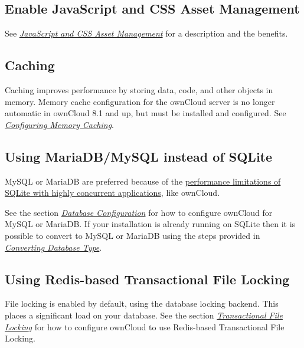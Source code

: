 \documentclass[letterpaper,10pt,english]{sphinxmanual}
\begin{document}
\subsection{Enable JavaScript and CSS Asset Management}
\label{configuration_server/oc_server_tuning:enable-javascript-and-css-asset-management}
See {\hyperref[configuration_server/js_css_asset_management_configuration::doc]{\emph{JavaScript and CSS Asset Management}}} for a description and the
benefits.


\subsection{Caching}
\label{configuration_server/oc_server_tuning:caching}\label{configuration_server/oc_server_tuning:id1}
Caching improves performance by storing data, code, and other objects in memory.
Memory cache configuration for the ownCloud server is no longer automatic in
ownCloud 8.1 and up, but must be installed and configured. See
{\hyperref[configuration_server/caching_configuration::doc]{\emph{Configuring Memory Caching}}}.


\subsection{Using MariaDB/MySQL instead of SQLite}
\label{configuration_server/oc_server_tuning:using-mariadb-mysql-instead-of-sqlite}
MySQL or MariaDB are preferred because of the \href{http://www.sqlite.org/whentouse.html}{performance limitations of
SQLite with highly concurrent applications}, like ownCloud.

See the section {\hyperref[configuration_database/linux_database_configuration::doc]{\emph{Database Configuration}}} for how to
configure ownCloud for MySQL or MariaDB. If your installation is already running on
SQLite then it is possible to convert to MySQL or MariaDB using the steps provided
in {\hyperref[configuration_database/db_conversion::doc]{\emph{Converting Database Type}}}.


\subsection{Using Redis-based Transactional File Locking}
\label{configuration_server/oc_server_tuning:using-redis-based-transactional-file-locking}
File locking is enabled by default, using the database locking backend. This
places a significant load on your database. See the section
{\hyperref[configuration_files/files_locking_transactional::doc]{\emph{Transactional File Locking}}} for how to
configure ownCloud to use Redis-based Transactional File Locking.
\end{document}
